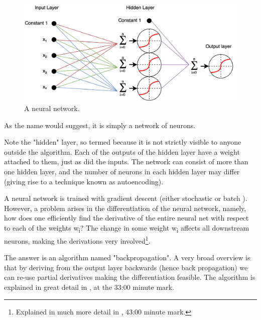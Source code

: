 \documentclass[a4paper, 12pt]{article}
\begin{document}
                        \begin{figure}[h]
                            \caption{A neural network.}
                            \centering
                            \includegraphics[width=\textwidth]{neuralNetwork}
                        \end{figure}  
                        
                        \par As the name would suggest, it is simply a network of neurons. 
                        
                        \par Note the "hidden" layer, so termed because it is not strictly visible to anyone outside the algorithm. Each of the outputs of the hidden layer have a weight attached to them, just as did the inputs. The network can consist of more than one hidden layer, and the number of neurons in each hidden layer may differ (giving rise to a technique known as autoencoding\cite{autoEncoding}).
                        
                        \par A neural network is trained with gradient descent (either stochastic or batch \cite{caltechNeuralNetwork}). However, a problem arises in the differentiation of the neural network, namely, how does one efficiently find the derivative of the entire neural net with respect to each of the weights w\textsubscript{i}? The change in some weight w\textsubscript{i} affects all downstream neurons, making the derivations very involved\footnote{Explained in much more detail in \cite{mitNeuralNetwork}, 43:00 minute mark.}.
                        
                        \par The answer is an algorithm named "backpropagation". A very broad overview is that by deriving from the output layer backwards (hence back propagation) we can re-use partial derivatives making the differentiation feasible. The algorithm is explained in great detail in \cite{caltechNeuralNetwork}, at the 33:00 minute mark.
                        
\end{document}
